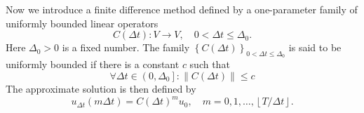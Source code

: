 \begin{frame}
	Now we introduce a finite difference method defined by a one-parameter
	family of uniformly bounded linear operators
	\begin{equation*}
		C\left(\Delta t\right)\colon V\to V,\quad 0<\Delta t\leq\Delta_{0}.
	\end{equation*}
	Here $\Delta_{0}>0$ is a fixed number.
	The family $\left\{C\left(\Delta t\right)\right\}_{0<\Delta t\leq\Delta_{0}}$
	is said to be uniformly bounded if there is a constant $c$ such that
	\begin{equation*}
		\forall\Delta t\in\left(0,\Delta_{0}\right]:
		\left\|C\left(\Delta t\right)\right\|\leq c
	\end{equation*}
	The approximate solution is then defined by
	\begin{equation*}
		u_{\Delta t}\left(m\Delta t\right)=
			{C\left(\Delta t\right)}^{m}u_{0},\quad m=0,1,\dotsc,\left\lfloor T/\Delta t\right\rfloor.
	\end{equation*}
\end{frame}

